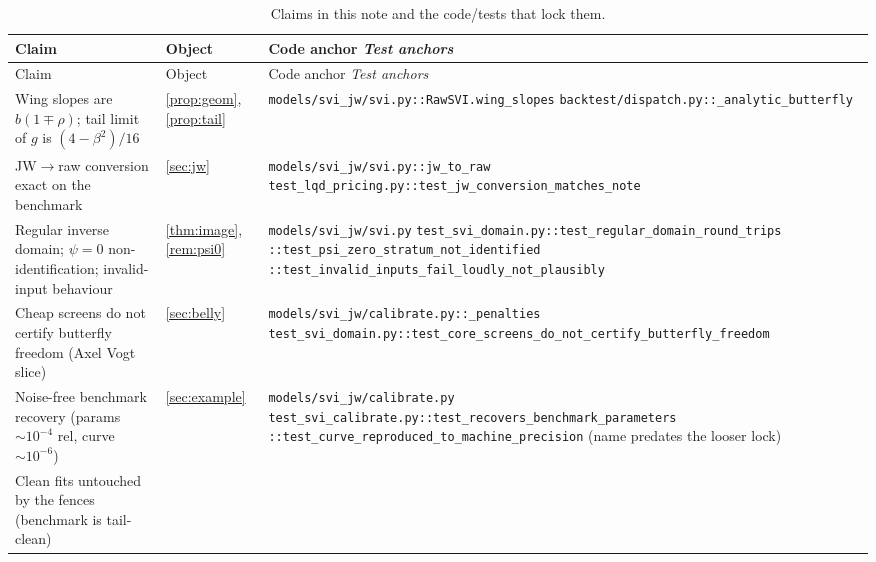 \documentclass[11pt]{article}
\begin{document}
\begingroup
\small
\setlength{\tabcolsep}{4pt}
\renewcommand{\arraystretch}{1.14}
\begin{longtable}{@{}p{}p{}p{}@{}}
\caption{Claims in this note and the code/tests that lock them.}\\
\toprule Claim & Object & Code anchor \newline \emph{Test anchors}\\ \midrule
\endfirsthead
\toprule Claim & Object & Code anchor \newline \emph{Test anchors}\\ \midrule
\endhead
Wing slopes are $b(1\mp\rho)$; tail limit of $g$ is $(4-\beta^2)/16$ &
\cref{prop:geom}, \cref{prop:tail} &
\nolinkurl{models/svi_jw/svi.py::RawSVI.wing_slopes}\newline
\nolinkurl{backtest/dispatch.py::_analytic_butterfly}\\
\addlinespace
JW$\to$raw conversion exact on the benchmark &
\cref{sec:jw} &
\nolinkurl{models/svi_jw/svi.py::jw_to_raw}\newline
\nolinkurl{test_lqd_pricing.py::test_jw_conversion_matches_note}\\
\addlinespace
Regular inverse domain; $\psi=0$ non-identification; invalid-input behaviour &
\cref{thm:image}, \cref{rem:psi0} &
\nolinkurl{models/svi_jw/svi.py}\newline
\nolinkurl{test_svi_domain.py::test_regular_domain_round_trips}\newline
\nolinkurl{::test_psi_zero_stratum_not_identified}\newline
\nolinkurl{::test_invalid_inputs_fail_loudly_not_plausibly}\\
\addlinespace
Cheap screens do not certify butterfly freedom (Axel Vogt slice) &
\cref{sec:belly} &
\nolinkurl{models/svi_jw/calibrate.py::_penalties}\newline
\nolinkurl{test_svi_domain.py::test_core_screens_do_not_certify_butterfly_freedom}\\
\addlinespace
Noise-free benchmark recovery (params $\sim10^{-4}$ rel, curve $\sim10^{-6}$) &
\cref{sec:example} &
\nolinkurl{models/svi_jw/calibrate.py}\newline
\nolinkurl{test_svi_calibrate.py::test_recovers_benchmark_parameters}\newline
\nolinkurl{::test_curve_reproduced_to_machine_precision} (name predates the
looser lock)\\
\addlinespace
Clean fits untouched by the fences (benchmark is tail-clean) &

\end{longtable}
\end{document}

